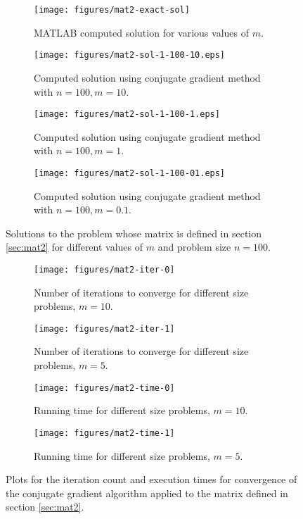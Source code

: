 \begin{figure}[ht!]
\begin{subfigure}{0.48\textwidth}
	\centering
    \texttt{[image: figures/mat2-exact-sol]}
    \caption{MATLAB computed solution for various values of $m$.}
\end{subfigure}
\hfill
\begin{subfigure}{0.48\textwidth}
	\centering
    \texttt{[image: figures/mat2-sol-1-100-10.eps]}
    \caption{Computed solution using conjugate gradient method with $n=100, m=10$.}
\end{subfigure}
\par\bigskip
\begin{subfigure}{0.48\textwidth}
	\centering
    \texttt{[image: figures/mat2-sol-1-100-1.eps]}
    \caption{Computed solution using conjugate gradient method with $n=100, m=1$.}
\end{subfigure}
\hfill
\begin{subfigure}{0.48\textwidth}
	\centering
    \texttt{[image: figures/mat2-sol-1-100-01.eps]}
    \caption{Computed solution using conjugate gradient method with $n=100, m=0.1$.}
\end{subfigure}
\caption{Solutions to the problem whose matrix is defined in section \ref{sec:mat2} for different values of $m$ and problem size $n=100$.}
\label{fig:matrix2-solution}
\end{figure}

\begin{figure}[ht!]
\begin{subfigure}{0.48\textwidth}
	\centering
    \texttt{[image: figures/mat2-iter-0]}
    \caption{Number of iterations to converge for different size problems, $m=10$.}
\end{subfigure}
\hfill
\begin{subfigure}{0.48\textwidth}
	\centering
    \texttt{[image: figures/mat2-iter-1]}
    \caption{Number of iterations to converge for different size problems, $m=5$.}
\end{subfigure}
\par\bigskip
\begin{subfigure}{0.48\textwidth}
	\centering
    \texttt{[image: figures/mat2-time-0]}
    \caption{Running time for different size problems, $m=10$.}
\end{subfigure}
\hfill
\begin{subfigure}{0.48\textwidth}
	\centering
    \texttt{[image: figures/mat2-time-1]}
    \caption{Running time for different size problems, $m=5$.}
\end{subfigure}
\caption{Plots for the iteration count and execution times for convergence of the conjugate gradient algorithm applied to the matrix defined in section \ref{sec:mat2}.}
\label{fig:matrix2-compare}
\end{figure}


